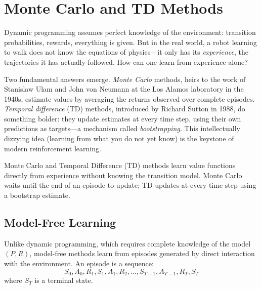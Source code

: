\chapter{Monte Carlo and TD Methods}
\label{ch:monte_carlo}

Dynamic programming assumes perfect knowledge of the environment: transition probabilities, rewards, everything is given. But in the real world, a robot learning to walk does not know the equations of physics---it only has its \emph{experience}, the trajectories it has actually followed. How can one learn from experience alone?

Two fundamental answers emerge. \emph{Monte Carlo} methods, heirs to the work of Stanislaw Ulam and John von Neumann at the Los Alamos laboratory in the 1940s, estimate values by averaging the returns observed over complete episodes. \emph{Temporal difference} (TD) methods, introduced by Richard Sutton in 1988, do something bolder: they update estimates at every time step, using their own predictions as targets---a mechanism called \emph{bootstrapping}. This intellectually dizzying idea (learning from what you do not yet know) is the keystone of modern reinforcement learning.

\begin{intuition}
Monte Carlo and Temporal Difference (TD) methods learn value functions directly
from experience without knowing the transition model. Monte Carlo waits until
the end of an episode to update; TD updates at every time step using a
bootstrap estimate.
\end{intuition}

\section{Model-Free Learning}

Unlike dynamic programming, which requires complete knowledge of the model
$(P, R)$, model-free methods learn from episodes generated by direct interaction
with the environment. An episode is a sequence:
\[
    S_0, A_0, R_1, S_1, A_1, R_2, \ldots, S_{T-1}, A_{T-1}, R_T, S_T
\]
where $S_T$ is a terminal state.

